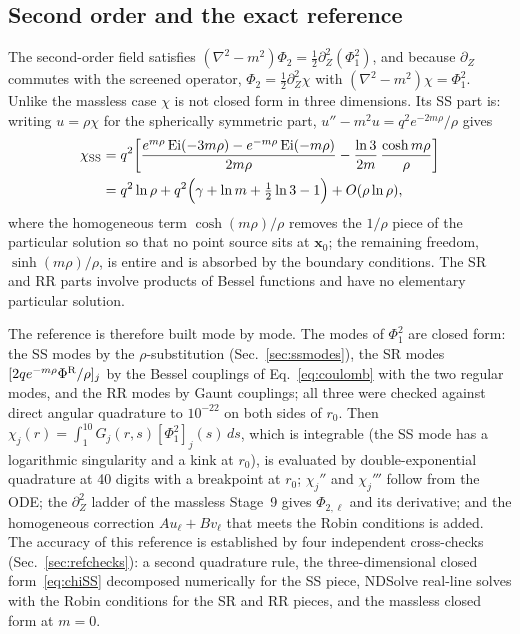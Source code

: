 \documentclass[11pt,a4paper]{article}
\newcommand{\x}{\mathbf{x}}
\newcommand{\PhiR}{\Phi^{\rm R}}
\begin{document}
\subsection{Second order and the exact reference}\label{sec:reference}
The second-order field satisfies $(\nabla^2-m^2)\Phi_2=\tfrac12\partial_Z^2(\Phi_1^2)$, and because $\partial_Z$ commutes with the screened operator, $\Phi_2=\tfrac12\partial_Z^2\chi$ with $(\nabla^2-m^2)\chi=\Phi_1^2$.
Unlike the massless case $\chi$ is not closed form in three dimensions.
Its SS part is: writing $u=\rho\chi$ for the spherically symmetric part, $u''-m^2u=q^2e^{-2m\rho}/\rho$ gives
\begin{align}
\chi_{\rm SS}&=q^2\bigg[\frac{e^{m\rho}\,{\rm Ei}(-3m\rho)-e^{-m\rho}\,{\rm Ei}(-m\rho)}{2m\rho}-\frac{\ln3}{2m}\,\frac{\cosh m\rho}{\rho}\bigg]\nonumber\\
&=q^2\ln\rho+q^2\Big(\gamma+\ln m+\tfrac12\ln3-1\Big)+O(\rho\ln\rho),
\label{eq:chiSS}
\end{align}
where the homogeneous term $\cosh(m\rho)/\rho$ removes the $1/\rho$ piece of the particular solution so that no point source sits at $\x_0$; the remaining freedom, $\sinh(m\rho)/\rho$, is entire and is absorbed by the boundary conditions.
The SR and RR parts involve products of Bessel functions and have no elementary particular solution.

The reference is therefore built mode by mode.
The modes of $\Phi_1^2$ are closed form: the SS modes by the $\rho$-substitution (Sec.~\ref{sec:ssmodes}), the SR modes $[2qe^{-m\rho}\PhiR/\rho]_j$ by the Bessel couplings of Eq.~\eqref{eq:coulomb} with the two regular modes, and the RR modes by Gaunt couplings; all three were checked against direct angular quadrature to $10^{-22}$ on both sides of $r_0$.
Then $\chi_j(r)=\int_1^{10}G_j(r,s)[\Phi_1^2]_j(s)\,ds$, which is integrable (the SS mode has a logarithmic singularity and a kink at $r_0$), is evaluated by double-exponential quadrature at 40 digits with a breakpoint at $r_0$; $\chi_j''$ and $\chi_j'''$ follow from the ODE; the $\partial_Z^2$ ladder of the massless Stage~9 gives $\Phi_{2,\ell}$ and its derivative; and the homogeneous correction $Au_\ell+Bv_\ell$ that meets the Robin conditions is added.
The accuracy of this reference is established by four independent cross-checks (Sec.~\ref{sec:refchecks}): a second quadrature rule, the three-dimensional closed form~\eqref{eq:chiSS} decomposed numerically for the SS piece, NDSolve real-line solves with the Robin conditions for the SR and RR pieces, and the massless closed form at $m=0$.
\end{document}

